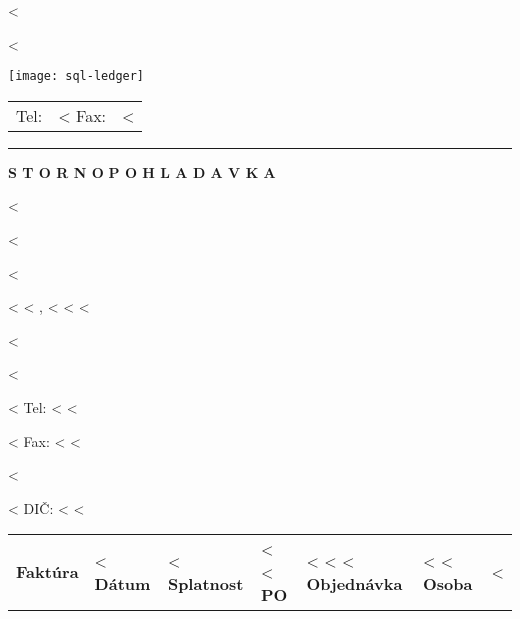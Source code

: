 \documentclass{scrartcl}
\begin{document}
\pagestyle{empty}

\fontsize{10pt}{12pt}\selectfont

\parbox{\textwidth}{%
  \parbox[b]{.42\textwidth}{%
    <%
   
    <%
  }
  \parbox[b]{.2\textwidth}{
    \texttt{[image: sql-ledger]}
  }\hfill
  \begin{tabular}[b]{rr@{}}
  Tel: & <%
  Fax: & <%
  \end{tabular}

  \rule[1.5em]{\textwidth}{0.5pt}
}

\centerline{\textbf{S T O R N O} \hspace{0.3cm} \textbf{P O H L A D A V K A}}

\vspace*{0.5cm}

\parbox[t]{.5\textwidth}{
<%

<%

<%

<%
<%
\hspace{-1mm}, <%
<%
<%

<%

\vspace{0.3cm}

<%

\vspace{0.2cm}

<%
Tel: <%
<%

<%
Fax: <%
<%

<%

<%
DIČ: <%
<%
}
\hfill
\begin{tabular}[t]{ll}
  \textbf{Faktúra} & <%
  \textbf{Dátum} & <%
  \textbf{Splatnost} & <%
  <%
    \textbf{PO} & <%
  <%
  <%
    \textbf{Objednávka} & <%
  <%
  \textbf{Osoba} & <%
\end{tabular}
\end{document}
